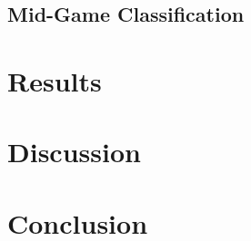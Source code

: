 \documentclass[12pt, a4paper, headinclude, twoside, plainheadsepline, open=right, numbers=noenddot, hidelinks, toc=listof, toc=bibliography]{scrreprt}
\begin{document}
\section{Mid-Game Classification}
\label{sec:midgame_class}



\chapter{Results}
\label{chap:results}


\chapter{Discussion}
\label{chap:discussion}


\chapter{Conclusion}
\label{chap:conclusion}

%
%
%
\printbibliography






\listoffigures																			%
\listoftables																			%
\cleardoublepage{}	%
\printacronyms[heading={chapter*}, name={List of Abbreviations}]
\end{document}
